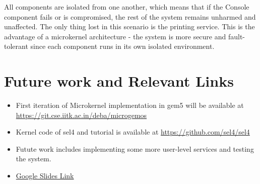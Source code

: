 \documentclass[
	a4paper, %
	11pt, %
	unnumberedsections, %
	twoside, %
]{LTJournalArticle}
\begin{document}
All components are isolated from one another, which means that if the Console component fails or is compromised, the rest of the system remains unharmed and unaffected. The only thing lost in this scenario is the printing service. This is the advantage of a microkernel architecture - the system is more secure and fault-tolerant since each component runs in its own isolated environment.


\section{Future work and Relevant Links}
\begin{itemize}
	\item First iteration of Microkernel implementation in gem5 will be available at \url{https://git.cse.iitk.ac.in/deba/microgemos}
	\item Kernel code of sel4 and tutorial is available at \url{https://github.com/sel4/sel4}
	\item Futute work includes implementing some more user-level services and testing the system.
	\item \href{https://docs.google.com/presentation/d/1ugVbGRoHd7K8TiUXV4uv9d5jXUgYuYz5uG2ctlLUjuc/edit?usp=sharing}{Google Slides Link} 
\end{itemize}


\printbibliography%
\end{document}

